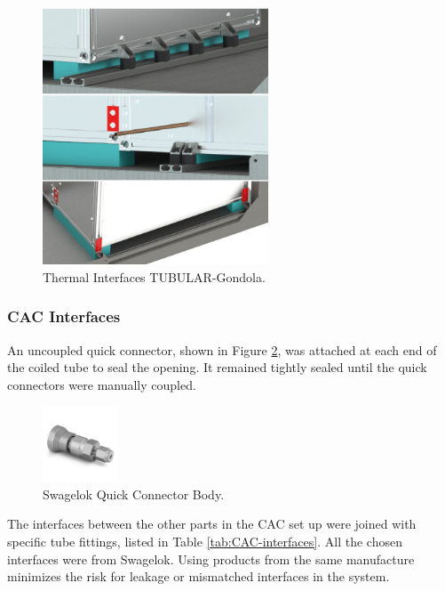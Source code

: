 \begin{figure}[H]
    \centering
    \includegraphics[width=0.6\textwidth]{4-experiment-design/img/Mechanical/gondola_fixation.png}
    \caption{Thermal Interfaces TUBULAR-Gondola.}
    \label{fig:thermal_interface}
\end{figure}

\subsubsection{CAC Interfaces}
An uncoupled quick connector, shown in Figure \ref{fig:Quick-connector-body}, was attached at each end of the coiled tube to seal the opening. It remained tightly sealed until the quick connectors were manually coupled. 

\begin{figure}[H]
    \centering
    \includegraphics[width=0.2\textwidth]{4-experiment-design/img/Mechanical/CAC-QC-Outlet.jpg}
    \caption{Swagelok Quick Connector Body.}
    \label{fig:Quick-connector-body}
\end{figure}

The interfaces between the other parts in the CAC set up were joined with specific tube fittings, listed in Table \ref{tab:CAC-interfaces}. All the chosen interfaces were from Swagelok. Using products from the same manufacture minimizes the risk for leakage or mismatched interfaces in the system. 

